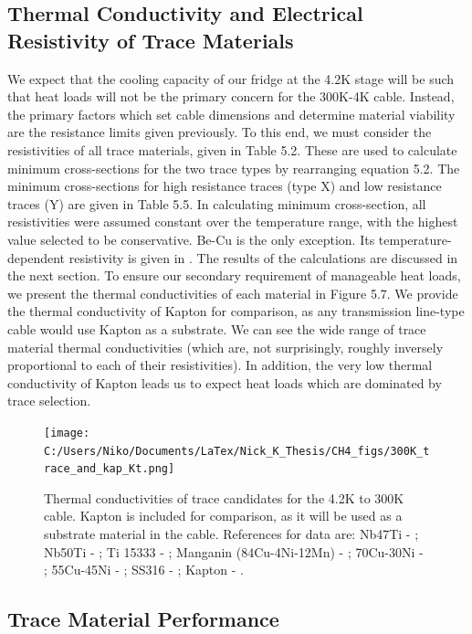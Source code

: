 \documentclass{report}
\begin{document}
\subsection{Thermal Conductivity and Electrical Resistivity of Trace Materials}

We expect that the cooling capacity of our fridge at the 4.2K stage will be such that heat loads will not be the primary concern for the 300K-4K cable. Instead, the primary factors which set cable dimensions and determine material viability are the resistance limits given previously. To this end, we must consider the resistivities of all trace materials, given in Table 5.2. These are used to calculate minimum cross-sections for the two trace types by rearranging equation 5.2. The minimum cross-sections for high resistance traces (type X) and low resistance traces (Y) are given in Table 5.5. In calculating minimum cross-section, all resistivities were assumed constant over the temperature range, with the highest value selected to be conservative. Be-Cu is the only exception. Its temperature-dependent resistivity is given in \cite{Sciver1986}. The results of the calculations are discussed in the next section.
To ensure our secondary requirement of manageable heat loads, we present the thermal conductivities of each material in  Figure 5.7. We provide the thermal conductivity of Kapton for comparison, as any transmission line-type cable would use Kapton as a substrate. We can see the wide range of trace material thermal conductivities (which are, not surprisingly, roughly inversely proportional to each of their resistivities). In addition, the very low thermal conductivity of Kapton leads us to expect heat loads which are dominated by trace selection.

\begin{figure}[ht]
\centering
\texttt{[image: C:/Users/Niko/Documents/LaTex/Nick\_K\_Thesis/CH4\_figs/300K\_trace\_and\_kap\_Kt.png]}
\caption{Thermal conductivities of trace candidates for the 4.2K to 300K cable. Kapton is included for comparison, as it will be used as a substrate material in the cable. References for data are: Nb47Ti - \cite{Blake} ; Nb50Ti - \cite{Flachbart1978} ; Ti 15333 - \cite{Canavan2006} ; Manganin (84Cu-4Ni-12Mn) - \cite{tou} ; 70Cu-30Ni - \cite{Blake} ; 55Cu-45Ni - \cite{tou} ; SS316 - \cite{ss316_nist} ; Kapton - \cite{Rule1996}.}
\end{figure}

\subsection{Trace Material Performance}
\end{document}
